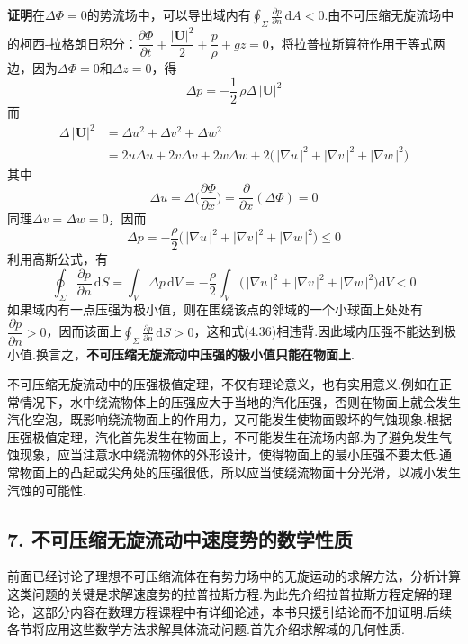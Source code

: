 \textbf{证明}\quad 在$\Delta\Phi=0$的势流场中，可以导出域内有$\displaystyle\oint_\Sigma\frac{\partial p}{\partial n}\,\mathrm{d}A<0$.由不可压缩无旋流场中的柯西-拉格朗日积分：$\dfrac{\partial\Phi}{\partial t}+\dfrac{|\boldsymbol{U}|^{2}}{2}+\dfrac{p}{\rho}+gz=0$，将拉普拉斯算符作用于等式两边，因为$\Delta\Phi=0$和$\Delta z=0$，得
\begin{equation*}
\Delta p=-\frac{1}{2}\,\rho\Delta\,|\boldsymbol{U}|^{2}
\tag{4.35}
\end{equation*}
而
\begin{align*}
\Delta\,|\boldsymbol{U}|^{2}&=\Delta u^{2}+\Delta v^{2}+\Delta w^{2}\\
&=2u\Delta u+2v\Delta v+2w\Delta w+2\big(\,|\nabla u\,|^{2}+|\nabla v\,|^{2}+|\nabla w\,|^{2}\big)
\end{align*}
其中
\[
\Delta u=\Delta\Big(\frac{\partial\Phi}{\partial x}\Big)=\frac{\partial}{\partial x}(\Delta\Phi)=0
\]
同理$\Delta v=\Delta w=0$，因而
\[
\Delta p=-\frac{\rho}{2}\big(\,|\nabla u\,|^{2}+|\nabla v\,|^{2}+|\nabla w\,|^{2}\big)\leqslant 0
\]
利用高斯公式，有
\begin{equation*}
\oint_\Sigma\frac{\partial p}{\partial n}\,\mathrm{d}S=\int_V\Delta p\,\mathrm{d}V=-\frac{\rho}{2}\int_V\big(\,|\nabla u\,|^{2}+|\nabla v\,|^{2}+|\nabla w\,|^{2}\big)\mathrm{d}V<0
\tag{4.36}
\end{equation*}
如果域内有一点压强为极小值，则在围绕该点的邻域的一个小球面上处处有$\dfrac{\partial p}{\partial n}>0$，因而该面上$\displaystyle\oint_\Sigma\frac{\partial p}{\partial n}\,\mathrm{d}S>0$，这和式(4.36)相违背.因此域内压强不能达到极小值.换言之，\textbf{不可压缩无旋流动中压强的极小值只能在物面上}.

不可压缩无旋流动中的压强极值定理，不仅有理论意义，也有实用意义.例如在正常情况下，水中绕流物体上的压强应大于当地的汽化压强，否则在物面上就会发生汽化空泡，既影响绕流物面上的作用力，又可能发生使物面毁坏的气蚀现象.根据压强极值定理，汽化首先发生在物面上，不可能发生在流场内部.为了避免发生气蚀现象，应当注意水中绕流物体的外形设计，使得物面上的最小压强不要太低.通常物面上的凸起或尖角处的压强很低，所以应当使绕流物面十分光滑，以减小发生汽蚀的可能性.

\subsection*{7. 不可压缩无旋流动中速度势的数学性质}

前面已经讨论了理想不可压缩流体在有势力场中的无旋运动的求解方法，分析计算这类问题的关键是求解速度势的拉普拉斯方程.为此先介绍拉普拉斯方程定解的理论，这部分内容在数理方程课程中有详细论述，本书只援引结论而不加证明.后续各节将应用这些数学方法求解具体流动问题.首先介绍求解域的几何性质.

